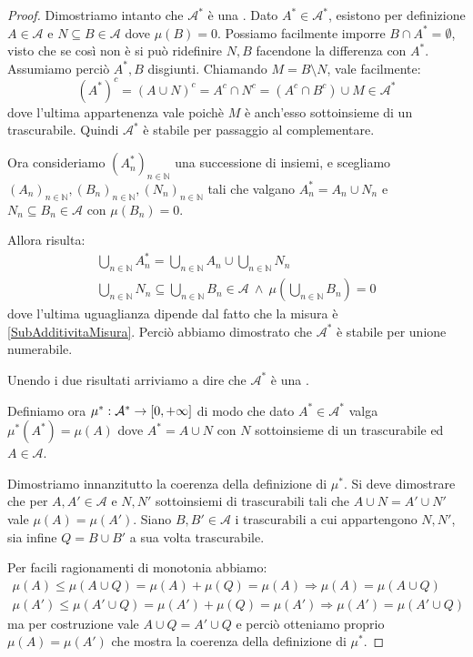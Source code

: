 \begin{proof}
	Dimostriamo intanto che $\mathcal A^*$ è una \sigalg{}.
	Dato $A^*\in\mathcal A^*$, esistono per definizione $A\in\mathcal A$ e $N\subseteq B\in\mathcal A$ dove $\mu(B)=0$. Possiamo facilmente imporre $B\cap A^*=\emptyset$, visto che se così non è si può ridefinire $N,B$ facendone la differenza con $A^*$. Assumiamo perciò $A^*,B$ disgiunti.
	Chiamando $M=B\setminus N$, vale facilmente:
	\begin{equation*}
		(A^*)^c=(A\cup N)^c=A^c\cap N^c=(A^c\cap B^c )\cup M \in\mathcal A^*
	\end{equation*}
	dove l'ultima appartenenza vale poichè $M$ è anch'esso sottoinsieme di un trascurabile. Quindi $\mathcal A^*$ è stabile per passaggio al complementare.
	
	Ora consideriamo $(A^*_n)_{n\in\mathbb N}$ una successione di insiemi, e scegliamo $(A_n)_{n\in\mathbb N},(B_n)_{n\in\mathbb N},(N_n)_{n\in\mathbb N}$ tali che valgano $A^*_n=A_n\cup N_n$ e $N_n\subseteq B_n\in\mathcal A$ con $\mu(B_n)=0$.
	
	Allora risulta:
	\begin{align*}
		\bigcup_{n\in\mathbb N}A^*_n=\bigcup_{n\in\mathbb N}A_n \cup \bigcup_{n\in\mathbb N}N_n\\
		\bigcup_{n\in\mathbb N}N_n\subseteq \bigcup_{n\in\mathbb N}B_n\in\mathcal A\ \wedge\ \mu\left(\bigcup_{n\in\mathbb N}B_n\right)=0
	\end{align*}
	dove l'ultima uguaglianza dipende dal fatto che la misura è \sigsubadd{} \cref{SubAdditivitaMisura}. Perciò abbiamo dimostrato che $\mathcal A^*$ è stabile per unione numerabile.
	
	Unendo i due risultati arriviamo a dire che $\mathcal A^*$ è una \sigalg{}.
	
	Definiamo ora $\mu^*:\mathcal A^*\to[0,+\infty]$ di modo che dato $A^*\in\mathcal A^*$ valga $\mu^*(A^*)=\mu(A)$ dove $A^*=A\cup N$ con $N$ sottoinsieme di un trascurabile ed $A\in\mathcal A$.
	
	Dimostriamo innanzitutto la coerenza della definizione di $\mu^*$. Si deve dimostrare che per $A,A'\in\mathcal A$ e $N,N'$ sottoinsiemi di trascurabili tali che $A\cup N=A'\cup N'$ vale $\mu(A)=\mu(A')$. Siano $B,B'\in\mathcal A$ i trascurabili a cui appartengono $N,N'$, sia infine $Q=B\cup B'$ a sua volta trascurabile.
	
	Per facili ragionamenti di monotonia abbiamo:
	\begin{align*}
		\mu(A)\le \mu(A\cup Q) =\mu(A)+\mu(Q)=\mu(A) \Longrightarrow \mu(A)=\mu(A\cup Q)\\
		\mu(A')\le \mu(A'\cup Q) =\mu(A')+\mu(Q)=\mu(A') \Longrightarrow \mu(A')=\mu(A'\cup Q)
	\end{align*}
	ma per costruzione vale $A\cup Q=A'\cup Q$ e perciò otteniamo proprio $\mu(A)=\mu(A')$ che mostra la coerenza della definizione di $\mu^*$.
	

\end{proof}
